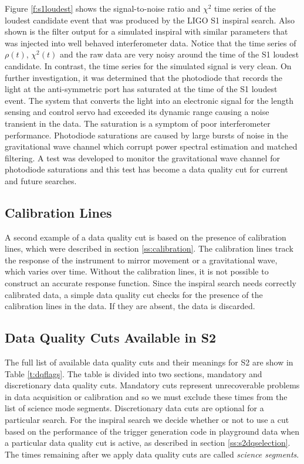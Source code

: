 Figure \ref{f:s1loudest} shows the signal-to-noise ratio and $\chi^2$ time
series of the loudest candidate event that was produced by the LIGO S1
inspiral search. Also shown is the filter output for a simulated inspiral
with similar parameters that was injected into well behaved
interferometer data.  Notice that the time series of $\rho(t)$, $\chi^2(t)$
and the raw data are very noisy around the time of the S1 loudest candidate.
In contrast, the time series for the simulated signal is very clean. On
further investigation, it was determined that the photodiode that records the
light at the anti-symmetric port has saturated at the time of the S1 loudest
event. The system that converts the light into an electronic signal for the
length sensing and control servo had exceeded its dynamic range causing a
noise transient in the data.  The saturation is a symptom of poor
interferometer performance. Photodiode saturations are caused by large bursts
of noise in the gravitational wave channel which corrupt power spectral
estimation and matched filtering. A test was developed to monitor the
gravitational wave channel for photodiode saturations and this test has become
a data quality cut for current and future searches.

\subsection{Calibration Lines}
\label{ss:calcut}

A second example of a data quality cut is based on the presence of calibration
lines, which were described in section \ref{ss:calibration}. The calibration
lines track the response of the instrument to mirror movement or a
gravitational wave, which varies over time. Without the calibration lines, it
is not possible to construct an accurate response function. Since the inspiral
search needs correctly calibrated data, a simple data quality cut checks for
the presence of the calibration lines in the data. If they are absent, the
data is discarded.

\subsection{Data Quality Cuts Available in S2}
\label{ss:s2dq}

The full list of available data quality cuts and their meanings for S2 are
show in Table \ref{t:dqflags}. The table is divided into two sections,
mandatory and discretionary data quality cuts. Mandatory cuts represent
unrecoverable problems in data acquisition or calibration and so we must exclude
these times from the list of science mode segments. Discretionary data cuts
are optional for a particular search. For the inspiral search we decide
whether or not to use a cut based on the performance of the trigger generation
code in playground data when a particular data quality cut is active, as
described in section \ref{ss:s2dqselection}.  The times remaining after we
apply data quality cuts are called \emph{science segments}.

